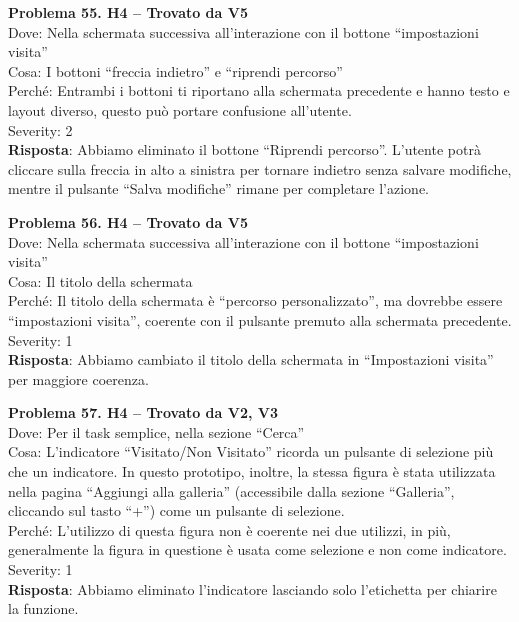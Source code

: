 \documentclass{article}
\begin{document}
\noindent \textbf{Problema 55. H4 – Trovato da V5} \\
Dove: Nella schermata successiva all’interazione con il bottone “impostazioni visita” \\
Cosa: I bottoni “freccia indietro” e “riprendi percorso” \\
Perché: Entrambi i bottoni ti riportano alla schermata precedente e hanno testo e layout diverso, questo può portare confusione all’utente. \\
Severity: 2 \\
\textbf{Risposta}: Abbiamo eliminato il bottone “Riprendi percorso”. L’utente potrà cliccare sulla freccia in alto a sinistra per tornare indietro senza salvare modifiche, mentre il pulsante “Salva modifiche” rimane per completare l’azione.

\noindent \textbf{Problema 56. H4 – Trovato da V5} \\
Dove: Nella schermata successiva all’interazione con il bottone “impostazioni visita” \\
Cosa: Il titolo della schermata \\
Perché: Il titolo della schermata è “percorso personalizzato”, ma dovrebbe essere “impostazioni visita”, coerente con il pulsante premuto alla schermata precedente. \\
Severity: 1 \\
\textbf{Risposta}: Abbiamo cambiato il titolo della schermata in “Impostazioni visita” per maggiore coerenza.

\noindent \textbf{Problema 57. H4 – Trovato da V2, V3} \\
Dove: Per il task semplice, nella sezione “Cerca” \\
Cosa: L’indicatore “Visitato/Non Visitato” ricorda un pulsante di selezione più che un indicatore. In questo prototipo, inoltre, la stessa figura è stata utilizzata nella pagina “Aggiungi alla galleria” (accessibile dalla sezione “Galleria”, cliccando sul tasto “+”) come un pulsante di selezione. \\
Perché: L’utilizzo di questa figura non è coerente nei due utilizzi, in più, generalmente la figura in questione è usata come selezione e non come indicatore. \\
Severity: 1 \\
\textbf{Risposta}: Abbiamo eliminato l’indicatore lasciando solo l’etichetta per chiarire la funzione.
\end{document}
